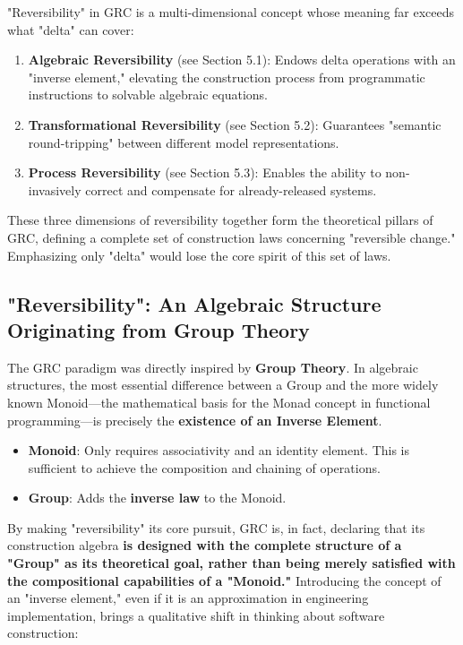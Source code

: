 \documentclass[11pt]{article}
\begin{document}
"Reversibility" in GRC is a multi-dimensional concept whose meaning far exceeds what "delta" can cover:
\begin{enumerate}
    \item   \textbf{Algebraic Reversibility} (see Section 5.1): Endows delta operations with an "inverse element," elevating the construction process from programmatic instructions to solvable algebraic equations.
    \item   \textbf{Transformational Reversibility} (see Section 5.2): Guarantees "semantic round-tripping" between different model representations.
    \item   \textbf{Process Reversibility} (see Section 5.3): Enables the ability to non-invasively correct and compensate for already-released systems.
\end{enumerate}

These three dimensions of reversibility together form the theoretical pillars of GRC, defining a complete set of construction laws concerning "reversible change." Emphasizing only "delta" would lose the core spirit of this set of laws.

\subsection{"Reversibility": An Algebraic Structure Originating from Group Theory}

The GRC paradigm was directly inspired by \textbf{Group Theory}. In algebraic structures, the most essential difference between a Group and the more widely known Monoid—the mathematical basis for the Monad concept in functional programming—is precisely the \textbf{existence of an Inverse Element}.

\begin{itemize}
    \item   \textbf{Monoid}: Only requires associativity and an identity element. This is sufficient to achieve the composition and chaining of operations.
    \item   \textbf{Group}: Adds the \textbf{inverse law} to the Monoid.
\end{itemize}

By making "reversibility" its core pursuit, GRC is, in fact, declaring that its construction algebra \textbf{is designed with the complete structure of a "Group" as its theoretical goal, rather than being merely satisfied with the compositional capabilities of a "Monoid."} Introducing the concept of an "inverse element," even if it is an approximation in engineering implementation, brings a qualitative shift in thinking about software construction:
\end{document}
